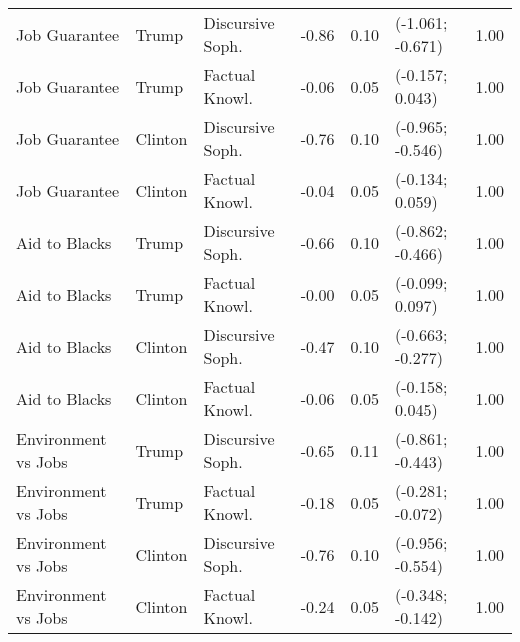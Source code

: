 \begin{table}[ht]
\begin{tabular}{lllrrlr}
  Job Guarantee & Trump & Discursive Soph. & -0.86 & 0.10 & (-1.061; -0.671) & 1.00 \\ 
  Job Guarantee & Trump & Factual Knowl. & -0.06 & 0.05 & (-0.157; 0.043) & 1.00 \\ 
  Job Guarantee & Clinton & Discursive Soph. & -0.76 & 0.10 & (-0.965; -0.546) & 1.00 \\ 
  Job Guarantee & Clinton & Factual Knowl. & -0.04 & 0.05 & (-0.134; 0.059) & 1.00 \\ 
  Aid to Blacks & Trump & Discursive Soph. & -0.66 & 0.10 & (-0.862; -0.466) & 1.00 \\ 
  Aid to Blacks & Trump & Factual Knowl. & -0.00 & 0.05 & (-0.099; 0.097) & 1.00 \\ 
  Aid to Blacks & Clinton & Discursive Soph. & -0.47 & 0.10 & (-0.663; -0.277) & 1.00 \\ 
  Aid to Blacks & Clinton & Factual Knowl. & -0.06 & 0.05 & (-0.158; 0.045) & 1.00 \\ 
  Environment vs Jobs & Trump & Discursive Soph. & -0.65 & 0.11 & (-0.861; -0.443) & 1.00 \\ 
  Environment vs Jobs & Trump & Factual Knowl. & -0.18 & 0.05 & (-0.281; -0.072) & 1.00 \\ 
  Environment vs Jobs & Clinton & Discursive Soph. & -0.76 & 0.10 & (-0.956; -0.554) & 1.00 \\ 
  Environment vs Jobs & Clinton & Factual Knowl. & -0.24 & 0.05 & (-0.348; -0.142) & 1.00 \\ 
   \hline
\end{tabular}
\end{table}
